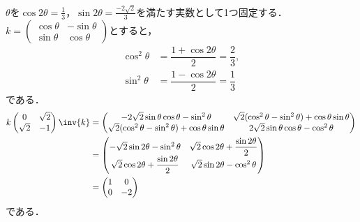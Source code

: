 \begin{npfwn}

  $ \theta $を$\cos 2\theta = \frac{1}{3} $，$\sin 2\theta = \frac{-2\sqrt{2}}{3} $を満たす実数として1つ固定する．$k =
  \begin{pmatrix}
    \cos \theta & -\sin \theta \\ \sin \theta & \cos \theta
  \end{pmatrix}
  $とすると，
  \begin{align*}
    \cos^2 \theta &= \dfrac{1 +\cos 2\theta}{2} = \dfrac{2}{3},\\
    \sin^2 \theta &= \dfrac{1-\cos 2\theta}{2} = \dfrac{1}{3}
  \end{align*}
  である．
  \begin{align*}
    k
    \begin{pmatrix}
      0 & \sqrt{2} \\
      \sqrt{2} & -1 
    \end{pmatrix}\inv{k} &=
                           \begin{pmatrix}
                             -2\sqrt{2}\sin\theta \cos\theta  - \sin^2\theta & \sqrt{2}(\cos^2 \theta - \sin^2\theta) + \cos\theta \sin\theta \\
                             \sqrt{2}(\cos^2 \theta - \sin^2\theta) + \cos\theta \sin\theta  & 2\sqrt{2}\sin\theta \cos\theta  - \cos^2\theta
                           \end{pmatrix}\\
        &=
          \begin{pmatrix}
            -\sqrt{2}\sin 2\theta  - \sin^2\theta & \sqrt{2}\cos 2\theta + \dfrac{\sin 2\theta}{2} \\
            \sqrt{2}\cos 2\theta + \dfrac{\sin 2\theta}{2}  &\sqrt{2}\sin 2 \theta - \cos^2\theta
          \end{pmatrix}\\
        &=
          \begin{pmatrix}
            1  &  0\\ 0 & -2
          \end{pmatrix}
  \end{align*}
  である．


\end{npfwn}
